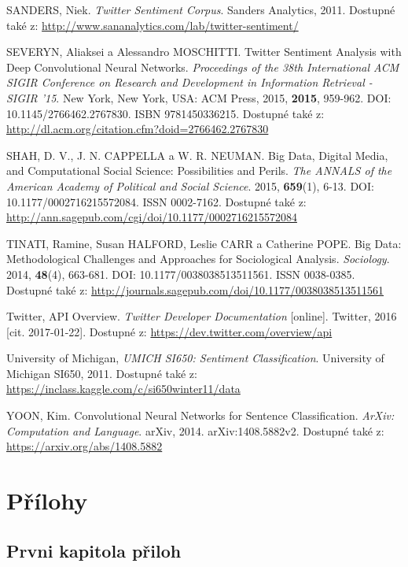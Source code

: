 \documentclass[12pt, a4paper]{article}
\numberwithin{equation}{section} 	%
\begin{document}
\begin{thebibliography}{99}
    SANDERS, Niek. \textit{Twitter Sentiment Corpus}. Sanders Analytics, 2011. Dostupné také z: \url{http://www.sananalytics.com/lab/twitter-sentiment/}

    SEVERYN, Aliaksei a Alessandro MOSCHITTI. Twitter Sentiment Analysis with Deep Convolutional Neural Networks. \textit{Proceedings of the 38th International ACM SIGIR Conference on Research and Development in Information Retrieval - SIGIR '15}. New York, New York, USA: ACM Press, 2015, \textbf{2015}, 959-962. DOI: 10.1145/2766462.2767830. ISBN 9781450336215. Dostupné také z: \url{http://dl.acm.org/citation.cfm?doid=2766462.2767830}

    SHAH, D. V., J. N. CAPPELLA a W. R. NEUMAN. Big Data, Digital Media, and Computational Social Science: Possibilities and Perils. \textit{The ANNALS of the American Academy of Political and Social Science}. 2015, \textbf{659}(1), 6-13. DOI: 10.1177/0002716215572084. ISSN 0002-7162. Dostupné také z: \url{http://ann.sagepub.com/cgi/doi/10.1177/0002716215572084}

    TINATI, Ramine, Susan HALFORD, Leslie CARR a Catherine POPE. Big Data: Methodological Challenges and Approaches for Sociological Analysis. \textit{Sociology}. 2014, \textbf{48}(4), 663-681. DOI: 10.1177/0038038513511561. ISSN 0038-0385. Dostupné také z: \url{http://journals.sagepub.com/doi/10.1177/0038038513511561}

    Twitter, API Overview. \textit{Twitter Developer Documentation} [online]. Twitter, 2016 [cit. 2017-01-22]. Dostupné z: \url{https://dev.twitter.com/overview/api}

    University of Michigan, \textit{UMICH SI650: Sentiment Classification}. University of Michigan SI650, 2011. Dostupné také z: \url{https://inclass.kaggle.com/c/si650winter11/data}

    YOON, Kim. Convolutional Neural Networks for Sentence Classification. \textit{ArXiv: Computation and Language}. arXiv, 2014. arXiv:1408.5882v2. Dostupné také z: \url{https://arxiv.org/abs/1408.5882}

\end{thebibliography}

\newpage
\section*{Přílohy}
\subsection*{Prvni kapitola přiloh}
\noindent
\end{document}
